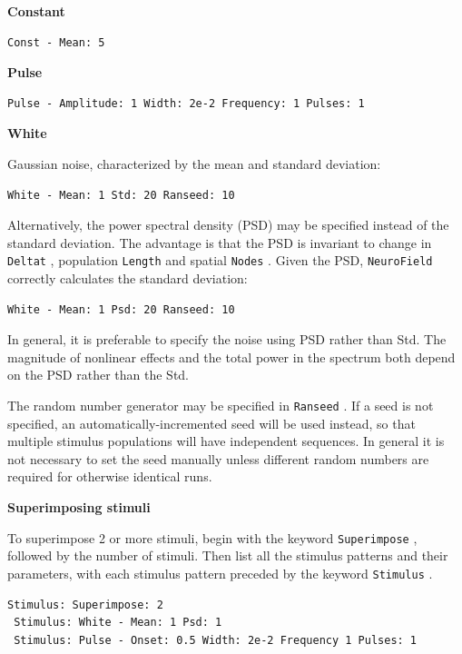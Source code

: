 \documentclass[12pt,a4paper]{article}
\newcommand{\type}[1]{ {\small\small\tt #1} }
\newcommand{\NF}[0]{ \type{NeuroField}}
\begin{document}
\begin{description}
\begin{itemize}
	\vspace{5mm}
	\textbf{Constant}
	\begin{lstlisting}
Const - Mean: 5
	\end{lstlisting}

	\vspace{5mm}
	\textbf{Pulse}
	\begin{lstlisting}
Pulse - Amplitude: 1 Width: 2e-2 Frequency: 1 Pulses: 1
	\end{lstlisting}

	\vspace{5mm}
	\textbf{White}

	Gaussian noise, characterized by the mean and standard deviation:
	\begin{lstlisting}
White - Mean: 1 Std: 20 Ranseed: 10
	\end{lstlisting}

	Alternatively, the power spectral density (PSD) may be specified instead of the standard deviation. The advantage is that the PSD is invariant to change in \type{Deltat}, population \type{Length} and spatial \type{Nodes}. Given the PSD, \NF correctly calculates the standard deviation:
	\begin{lstlisting}
White - Mean: 1 Psd: 20 Ranseed: 10
	\end{lstlisting}
    
    In general, it is preferable to specify the noise using PSD rather than Std. The magnitude of nonlinear effects and the total power in the spectrum both depend on the PSD rather than the Std.

	The random number generator	may be specified in \type{Ranseed}. If a seed is not specified, an automatically-incremented seed will be used instead, so that multiple stimulus populations will have independent sequences. In general it is not necessary to set the seed manually unless different random numbers are required for otherwise identical runs. 

	\vspace{5mm}
	\textbf{Superimposing stimuli}

	To superimpose 2 or more stimuli, begin with the keyword \type{Superimpose}, followed by the number of stimuli. Then list all the stimulus patterns and their parameters, with each stimulus pattern preceded by the keyword \type{Stimulus}.
	\begin{lstlisting}
Stimulus: Superimpose: 2
 Stimulus: White - Mean: 1 Psd: 1
 Stimulus: Pulse - Onset: 0.5 Width: 2e-2 Frequency 1 Pulses: 1
	\end{lstlisting}


\end{itemize}
\end{description}
\end{document}
